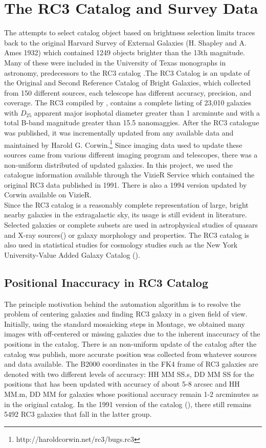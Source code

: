 \documentclass[5p]{elsarticle}
\begin{document}
\section{The RC3 Catalog and Survey Data}
The attempts to select catalog object based on brightness selection limits traces back to the original Harvard Survey of External Galaxies (H. Shapley and A. Ames 1932) which contained 1249 objects brighter than the 13th magnitude. Many of these were included in the University of Texas monographs in astronomy, predecessors to the  RC3 catalog .The RC3 Catalog is an update of the Original and Second Reference Catalog of Bright Galaxies, which collected from 150 different sources, each telescope has different accuracy, precision, and coverage. The RC3 compiled by \citealp{rc3}, contains a  complete listing of 23,010 galaxies with $D_25$ apparent major isophotal diameter  greater than 1 arcminute and with a total B-band magnitude greater than 15.5 nanomaggies. After the RC3 catalogue was published, it was incrementally updated from any available data and maintained by Harold G. Corwin.\footnote{http://haroldcorwin.net/rc3/bugs.rc3} Since imaging data used to update these sources came from various different imaging program and telescopes, there was a non-uniform distributed of updated galaxies. In this project, we used the catalogue information available through the VizieR Service  which contained the original  RC3 data published in 1991. There is also a 1994 version updated by Corwin available on VizieR. 
\\
\indent  Since the RC3 catalog  is a reasonably complete representation of large, bright nearby galaxies in the extragalactic sky, its usage is still evident in literature. Selected galaxies or complete subsets are used in astrophysical studies of  quasars and X-ray sources(\citealp{xray}) or  galaxy morphology and properties.  The RC3 catalog is also used in statistical studies  for cosmology studies such as the New York University-Value Added Galaxy Catalog (\citealp{nyuvagc}).
\subsection{Positional Inaccuracy in RC3 Catalog}
	\label{sec:position}
	The principle motivation behind the automation algorithm is to resolve the problem of centering galaxies and finding RC3 galaxy in a given field of view. Initially, using the standard mosaicking steps in Montage, we obtained many images with  off-centered or missing galaxies due to the inherent inaccuracy of the positions in the catalog. There is an non-uniform update of the catalog after the catalog was publish, more accurate position was collected from whatever sources and data available. The B2000 coordinates in the FK4 frame of  RC3 galaxies are denoted with two different levels of accuracy: HH MM SS.s, DD MM SS for the positions that has been updated  with accuracy of about 5-8 arcsec and  HH MM.m, DD MM for galaxies whose positional accuracy remain  1-2 arcminutes as in the original catalog.  In the 1991 version of the catalog (\citealp{rc31991}), there still remains 5492 RC3 galaxies that fall in the latter group.
\end{document}
